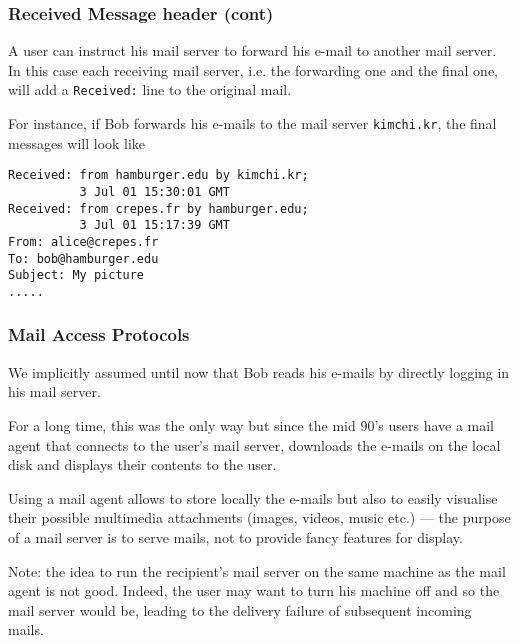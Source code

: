 %
\begin{frame}[containsverbatim]
\frametitle{Received Message header (cont)}

A user can instruct his mail server to forward his e-mail to another
mail server. In this case each receiving mail server, i.e. the
forwarding one and the final one, will add a \verb+Received:+ line to
the original mail.

For instance, if Bob forwards his e-mails to the mail server
\verb+kimchi.kr+, the final messages will look like
{\small
\begin{verbatim}
Received: from hamburger.edu by kimchi.kr;
          3 Jul 01 15:30:01 GMT
Received: from crepes.fr by hamburger.edu;
          3 Jul 01 15:17:39 GMT
From: alice@crepes.fr
To: bob@hamburger.edu
Subject: My picture
.....
\end{verbatim}
}

\end{frame}

%
\begin{frame}
\frametitle{Mail Access Protocols}

We implicitly assumed until now that Bob reads his e-mails by directly
logging in his mail server.

For a long time, this was the only way but since the mid 90's users
have a mail agent that connects to the user's mail server, downloads
the e-mails on the local disk and displays their contents to the user.

Using a mail agent allows to store locally the e-mails but also to
easily visualise their possible multimedia attachments (images,
videos, music etc.) --- the purpose of a mail server is to serve
mails, not to provide fancy features for display.

Note: the idea to run the recipient's mail server on the same machine
as the mail agent is not good. Indeed, the user may want to turn his
machine off and so the mail server would be, leading to the delivery
failure of subsequent incoming mails.

\end{frame}


